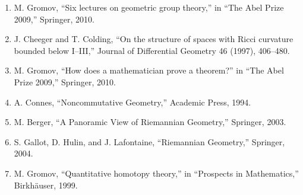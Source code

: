 \begin{enumerate}
\item M. Gromov, ``Six lectures on geometric group theory,'' in ``The Abel Prize 2009,'' Springer, 2010.
\item J. Cheeger and T. Colding, ``On the structure of spaces with Ricci curvature bounded below I--III,'' Journal of Differential Geometry 46 (1997), 406--480.
\item M. Gromov, ``How does a mathematician prove a theorem?'' in ``The Abel Prize 2009,'' Springer, 2010.
\item A. Connes, ``Noncommutative Geometry,'' Academic Press, 1994.
\item M. Berger, ``A Panoramic View of Riemannian Geometry,'' Springer, 2003.
\item S. Gallot, D. Hulin, and J. Lafontaine, ``Riemannian Geometry,'' Springer, 2004.
\item M. Gromov, ``Quantitative homotopy theory,'' in ``Prospects in Mathematics,'' Birkh\"auser, 1999.
\end{enumerate}
